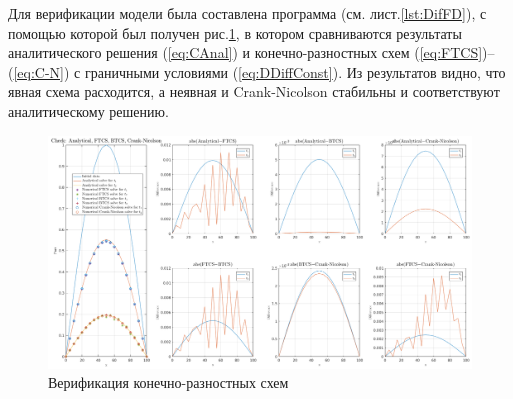 Для верификации модели была составлена программа (см. лист.\ref{lst:DifFD}), с помощью которой был получен рис.\ref{fig:DifFD}, в котором сравниваются результаты аналитического решения (\ref{eq:CAnal}) и конечно-разностных схем (\ref{eq:FTCS})--(\ref{eq:C-N}) с граничными условиями (\ref{eq:DDiffConst}). Из результатов видно, что явная схема расходится, а неявная и Crank-Nicolson стабильны и соответствуют аналитическому решению.
\begin{figure}[h!]
	\centering
	\includegraphics[width=0.8\linewidth]{assets/DifFD}
	\caption{Верификация конечно-разностных схем}
	\label{fig:DifFD}
\end{figure}
